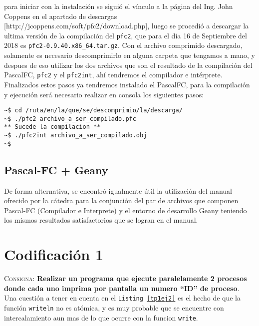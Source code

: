 \documentclass{article}
\begin{document}
para iniciar con la instalaci\'on se sigui\'o el v\'inculo a la p\'agina del Ing. John Coppens en el apartado de descargas [http://jcoppens.com/soft/pfc2/download.php], luego se procedi\'o a descargar la ultima versi\'on de la compilaci\'on del \texttt{pfc2}, que para el d\'ia 16 de Septiembre del 2018 es \texttt{pfc2-0.9.40.x86\_64.tar.gz}. Con el archivo comprimido descargado, solamente es necesario descomprimirlo en alguna carpeta que tengamos a mano, y despues de eso utilizar los dos archivos que son el resultado de la compilaci\'on del PascalFC, \texttt{pfc2} y el \texttt{pfc2int}, ah\'i tendremos el compilador e int\'erprete.\\

Finalizados estos pasos ya tendremos instalado el PascalFC, para la compilaci\'on y ejecuci\'on ser\'a necesario realizar en consola los siguientes pasos:

\begin{lstlisting}[caption={Compilaci\'on de y ejecuci\'on con pfc2}]
~$ cd /ruta/en/la/que/se/descomprimio/la/descarga/
~$ ./pfc2 archivo_a_ser_compilado.pfc
** Sucede la compilacion **
~$ ./pfc2int archivo_a_ser_compilado.obj
~$
\end{lstlisting}
\subsection{Pascal-FC + Geany}
De forma alternativa, se encontr\'o igualmente \'util la utilizaci\'on del manual ofrecido por la c\'atedra para la conjunci\'on del par de archivos que componen Pascal-FC (Compilador e Interprete) y el entorno de desarrollo Geany teniendo los mismos resultados satisfactorios que se logran en el manual.

\section{Codificaci\'on 1}
\label{sec:ej2}
\textsc{Consigna}: \textbf{Realizar un programa que ejecute paralelamente 2 procesos donde cada uno imprima por pantalla un numero ``ID'' de proceso}.\\



Una cuesti\'on a tener en cuenta en el \texttt{Listing \ref{tp1ej2}} es  el hecho de que la funci\'on \texttt{writeln} no es at\'omica, y es muy probable que se encuentre con intercalamiento aun mas de lo que ocurre con la funcion \texttt{write}.
\end{document}
